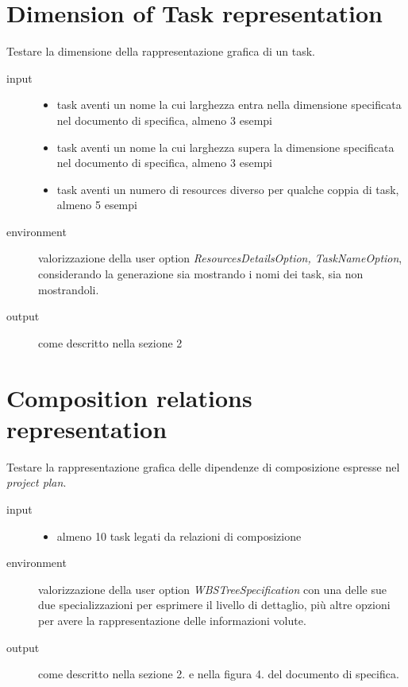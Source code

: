 \section{Dimension of Task representation}
\label{sec:WBSDimensionRepresentation}
Testare la dimensione della rappresentazione grafica di un task.
\begin{description}
\item[input] 
\quad
\begin{itemize}
  \item task aventi un nome la cui larghezza entra nella dimensione specificata
  nel documento di specifica, almeno 3 esempi
  \item task aventi un nome la cui larghezza supera la dimensione specificata
  nel documento di specifica, almeno 3 esempi
  \item task aventi un numero di resources diverso per qualche coppia di task,
  almeno 5 esempi
\end{itemize}
\item[environment] valorizzazione della user option
\emph{ResourcesDetailsOption, TaskNameOption}, considerando la generazione sia
mostrando i nomi dei task, sia non mostrandoli.
\item[output] come descritto nella sezione 2
\end{description}

\section{Composition relations representation}
Testare la rappresentazione grafica delle dipendenze di composizione espresse
nel \emph{project plan}.
\begin{description}
\item[input]  \quad
\begin{itemize}
  \item almeno 10 task legati da relazioni di composizione
\end{itemize}
\item[environment] valorizzazione della user option
\emph{WBSTreeSpecification} con una delle sue due specializzazioni per
esprimere il livello di dettaglio, pi\`u altre opzioni per avere la
rappresentazione delle informazioni volute.
\item[output] come descritto nella sezione 2. e nella figura 4. del
documento di specifica.
\end{description}

